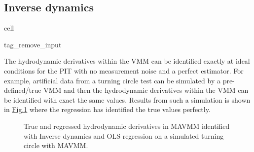 \documentclass[review]{elsarticle}
\begin{document}
\subsection{Inverse dynamics}
\label{\detokenize{06.40_results_inverse_dynamics:inverse-dynamics}}\label{\detokenize{06.40_results_inverse_dynamics::doc}}
\begin{sphinxuseclass}{cell}
\begin{sphinxuseclass}{tag_remove_input}
\end{sphinxuseclass}
\end{sphinxuseclass}
The hydrodynamic derivatives within the VMM can be identified exactly at ideal conditions for the PIT with no measurement noise and a perfect estimator. For example, artificial data from a turning circle test can be simulated by a pre-defined/true VMM and then the hydrodynamic derivatives within the VMM can be identified with exact the same values. Results from such a simulation is shown in \hyperref[\detokenize{06.40_results_inverse_dynamics:fig-bar-parameters}]{Fig.\@ \ref{\detokenize{06.40_results_inverse_dynamics:fig-bar-parameters}}} where the regression has identified the true values perfectly.

\begin{figure}[H]
\centering
\capstart

\noindent{}
\caption{True and regressed hydrodynamic derivatives in MAVMM identified with Inverse dynamics and OLS regression on a simulated turning circle with MAVMM.}\label{\detokenize{06.40_results_inverse_dynamics:fig-bar-parameters}}\end{figure}
\end{document}
